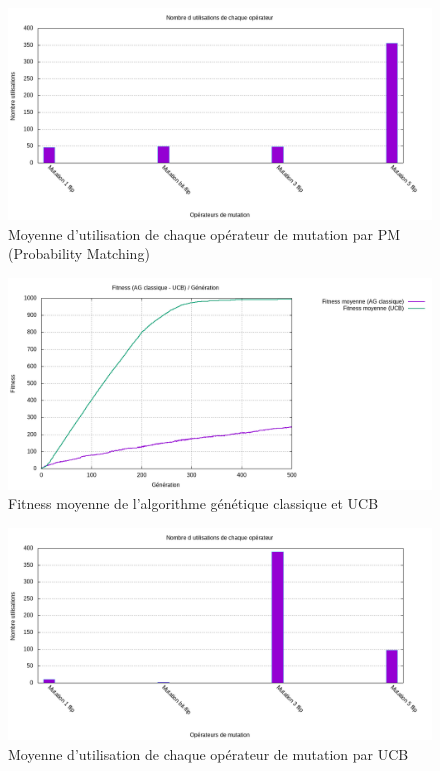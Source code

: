 \documentclass[12pt]{article}
\begin{document}
\begin{figure}[H]
	\begin{center}
		\includegraphics[scale=0.5]{img/histogrammeOppm.png}
		\caption{Moyenne d'utilisation de chaque opérateur de mutation par PM (Probability Matching)}
		\label{histogrammeOppm}
	\end{center}
\end{figure}

\begin{figure}[H]
	\begin{center}
		\includegraphics[scale=0.5]{img/curve_ag_ucb.png}
		\caption{Fitness moyenne de l'algorithme génétique classique et UCB}
		\label{curve_ag_ucb}
	\end{center}
\end{figure}

\begin{figure}[H]
	\begin{center}
		\includegraphics[scale=0.5]{img/histogrammeOpucb.png}
		\caption{Moyenne d'utilisation de chaque opérateur de mutation par UCB}
		\label{histogrammeOpucb}
	\end{center}
\end{figure}
\end{document}
